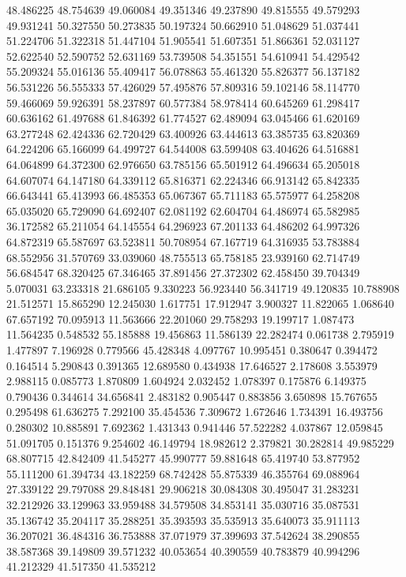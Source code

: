 48.486225
48.754639
49.060084
49.351346
49.237890
49.815555
49.579293
49.931241
50.327550
50.273835
50.197324
50.662910
51.048629
51.037441
51.224706
51.322318
51.447104
51.905541
51.607351
51.866361
52.031127
52.622540
52.590752
52.631169
53.739508
54.351551
54.610941
54.429542
55.209324
55.016136
55.409417
56.078863
55.461320
55.826377
56.137182
56.531226
56.555333
57.426029
57.495876
57.809316
59.102146
58.114770
59.466069
59.926391
58.237897
60.577384
58.978414
60.645269
61.298417
60.636162
61.497688
61.846392
61.774527
62.489094
63.045466
61.620169
63.277248
62.424336
62.720429
63.400926
63.444613
63.385735
63.820369
64.224206
65.166099
64.499727
64.544008
63.599408
63.404626
64.516881
64.064899
64.372300
62.976650
63.785156
65.501912
64.496634
65.205018
64.607074
64.147180
64.339112
65.816371
62.224346
66.913142
65.842335
66.643441
65.413993
66.485353
65.067367
65.711183
65.575977
64.258208
65.035020
65.729090
64.692407
62.081192
62.604704
64.486974
65.582985
36.172582
65.211054
64.145554
64.296923
67.201133
64.486202
64.997326
64.872319
65.587697
63.523811
50.708954
67.167719
64.316935
53.783884
68.552956
31.570769
33.039060
48.755513
65.758185
23.939160
62.714749
56.684547
68.320425
67.346465
37.891456
27.372302
62.458450
39.704349
5.070031
63.233318
21.686105
9.330223
56.923440
56.341719
49.120835
10.788908
21.512571
15.865290
12.245030
1.617751
17.912947
3.900327
11.822065
1.068640
67.657192
70.095913
11.563666
22.201060
29.758293
19.199717
1.087473
11.564235
0.548532
55.185888
19.456863
11.586139
22.282474
0.061738
2.795919
1.477897
7.196928
0.779566
45.428348
4.097767
10.995451
0.380647
0.394472
0.164514
5.290843
0.391365
12.689580
0.434938
17.646527
2.178608
3.553979
2.988115
0.085773
1.870809
1.604924
2.032452
1.078397
0.175876
6.149375
0.790436
0.344614
34.656841
2.483182
0.905447
0.883856
3.650898
15.767655
0.295498
61.636275
7.292100
35.454536
7.309672
1.672646
1.734391
16.493756
0.280302
10.885891
7.692362
1.431343
0.941446
57.522282
4.037867
12.059845
51.091705
0.151376
9.254602
46.149794
18.982612
2.379821
30.282814
49.985229
68.807715
42.842409
41.545277
45.990777
59.881648
65.419740
53.877952
55.111200
61.394734
43.182259
68.742428
55.875339
46.355764
69.088964
27.339122
29.797088
29.848481
29.906218
30.084308
30.495047
31.283231
32.212926
33.129963
33.959488
34.579508
34.853141
35.030716
35.087531
35.136742
35.204117
35.288251
35.393593
35.535913
35.640073
35.911113
36.207021
36.484316
36.753888
37.071979
37.399693
37.542624
38.290855
38.587368
39.149809
39.571232
40.053654
40.390559
40.783879
40.994296
41.212329
41.517350
41.535212
